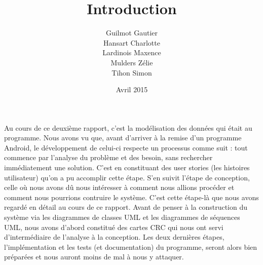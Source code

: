 \documentclass[11pt,a4paper]{article}
\title{Introduction}
\author{Guilmot Gautier \\ Hansart Charlotte \\ Lardinois Maxence \\ Mulders Zélie \\ Tihon Simon  }
\date{Avril 2015}
\begin{document}
\maketitle

Au cours de ce deuxième rapport, c'est la modélisation des données qui était au programme. Nous avons vu que, avant d'arriver à la remise d'un programme Android, le développement de celui-ci respecte un processus comme suit : tout commence par l'analyse du problème et des besoin, sans rechercher immédiatement une solution. C'est en constituant des user stories (les histoires utilisateur) qu'on a pu accomplir cette étape. S'en suivit l'étape de conception, celle où nous avons dû nous intéresser à comment nous allions procéder et comment nous pourrions contruire le système. C'est cette étape-là que nous avons regardé en détail au cours de ce rapport. Avant de penser à la construction du système via les diagrammes de classes UML et les diagrammes de séquences UML, nous avons d'abord constitué des cartes CRC qui nous ont servi d'intermédiaire de l'analyse à la conception.
Les deux dernières étapes, l'implémentation et les tests (et documentation) du programme, seront alors bien préparées et nous auront moins de mal à nous y attaquer.
\end{document}
